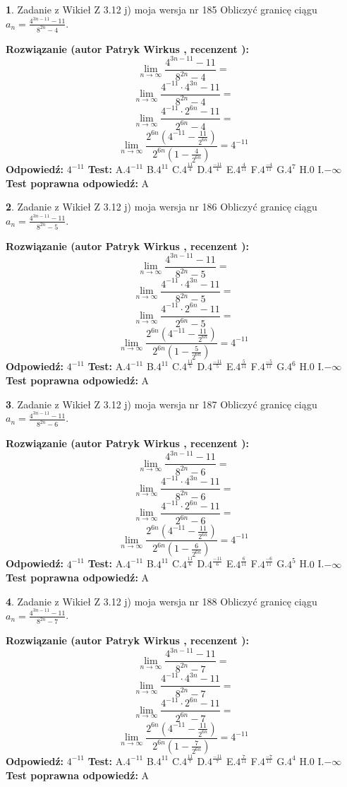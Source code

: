 \documentclass[12pt, a4paper]{article}
\theoremstyle{definition} %
\newtheorem{zad}{}
\newcommand{\zadStart}[1]{\begin{zad}#1\newline}
\newcommand{\zadStop}{\end{zad}}
\newcommand{\rozwStart}[2]{\noindent \textbf{Rozwiązanie (autor #1 , recenzent #2): }\newline}
\newcommand{\rozwStop}{\newline}
\newcommand{\odpStart}{\noindent \textbf{Odpowiedź:}\newline}
\newcommand{\odpStop}{\newline}
\newcommand{\testStart}{\noindent \textbf{Test:}\newline}
\newcommand{\testStop}{\newline}
\newcommand{\kluczStart}{\noindent \textbf{Test poprawna odpowiedź:}\newline}
\newcommand{\kluczStop}{\newline}
\begin{document}
\zadStart{Zadanie z Wikieł Z 3.12 j) moja wersja nr 185}
Obliczyć granicę ciągu $a_{n}=\frac{4^{3n-11}-11}{8^{2n}-4}$.
\zadStop
\rozwStart{Patryk Wirkus}{}
$$\lim\limits_{n\to\infty}\frac{4^{3n-11}-11}{8^{2n}-4}=$$
$$\lim\limits_{n\to\infty}\frac{4^{-11} \cdot 4^{3n}-11}{8^{2n}-4}=$$
$$\lim\limits_{n\to\infty}\frac{4^{-11} \cdot 2^{6n}-11}{2^{6n}-4}=$$
$$\lim\limits_{n\to\infty}\frac{2^{6n}(4^{-11} - \frac{11}{2^{6n}})}{2^{6n}(1-\frac{4}{2^{6n}})}= 4^{-11}$$
\rozwStop
\odpStart
$4^{-11}$
\odpStop
\testStart
A.$4^{-11}$
B.$4^{11}$
C.$4^{\frac{11}{4}}$
D.$4^{\frac{-11}{4}}$
E.$4^{\frac{4}{11}}$
F.$4^{\frac{-4}{11}}$
G.$4^{7}$
H.$0$
I.$-\infty$
\testStop
\kluczStart
A
\kluczStop



\zadStart{Zadanie z Wikieł Z 3.12 j) moja wersja nr 186}
Obliczyć granicę ciągu $a_{n}=\frac{4^{3n-11}-11}{8^{2n}-5}$.
\zadStop
\rozwStart{Patryk Wirkus}{}
$$\lim\limits_{n\to\infty}\frac{4^{3n-11}-11}{8^{2n}-5}=$$
$$\lim\limits_{n\to\infty}\frac{4^{-11} \cdot 4^{3n}-11}{8^{2n}-5}=$$
$$\lim\limits_{n\to\infty}\frac{4^{-11} \cdot 2^{6n}-11}{2^{6n}-5}=$$
$$\lim\limits_{n\to\infty}\frac{2^{6n}(4^{-11} - \frac{11}{2^{6n}})}{2^{6n}(1-\frac{5}{2^{6n}})}= 4^{-11}$$
\rozwStop
\odpStart
$4^{-11}$
\odpStop
\testStart
A.$4^{-11}$
B.$4^{11}$
C.$4^{\frac{11}{5}}$
D.$4^{\frac{-11}{5}}$
E.$4^{\frac{5}{11}}$
F.$4^{\frac{-5}{11}}$
G.$4^{6}$
H.$0$
I.$-\infty$
\testStop
\kluczStart
A
\kluczStop



\zadStart{Zadanie z Wikieł Z 3.12 j) moja wersja nr 187}
Obliczyć granicę ciągu $a_{n}=\frac{4^{3n-11}-11}{8^{2n}-6}$.
\zadStop
\rozwStart{Patryk Wirkus}{}
$$\lim\limits_{n\to\infty}\frac{4^{3n-11}-11}{8^{2n}-6}=$$
$$\lim\limits_{n\to\infty}\frac{4^{-11} \cdot 4^{3n}-11}{8^{2n}-6}=$$
$$\lim\limits_{n\to\infty}\frac{4^{-11} \cdot 2^{6n}-11}{2^{6n}-6}=$$
$$\lim\limits_{n\to\infty}\frac{2^{6n}(4^{-11} - \frac{11}{2^{6n}})}{2^{6n}(1-\frac{6}{2^{6n}})}= 4^{-11}$$
\rozwStop
\odpStart
$4^{-11}$
\odpStop
\testStart
A.$4^{-11}$
B.$4^{11}$
C.$4^{\frac{11}{6}}$
D.$4^{\frac{-11}{6}}$
E.$4^{\frac{6}{11}}$
F.$4^{\frac{-6}{11}}$
G.$4^{5}$
H.$0$
I.$-\infty$
\testStop
\kluczStart
A
\kluczStop



\zadStart{Zadanie z Wikieł Z 3.12 j) moja wersja nr 188}
Obliczyć granicę ciągu $a_{n}=\frac{4^{3n-11}-11}{8^{2n}-7}$.
\zadStop
\rozwStart{Patryk Wirkus}{}
$$\lim\limits_{n\to\infty}\frac{4^{3n-11}-11}{8^{2n}-7}=$$
$$\lim\limits_{n\to\infty}\frac{4^{-11} \cdot 4^{3n}-11}{8^{2n}-7}=$$
$$\lim\limits_{n\to\infty}\frac{4^{-11} \cdot 2^{6n}-11}{2^{6n}-7}=$$
$$\lim\limits_{n\to\infty}\frac{2^{6n}(4^{-11} - \frac{11}{2^{6n}})}{2^{6n}(1-\frac{7}{2^{6n}})}= 4^{-11}$$
\rozwStop
\odpStart
$4^{-11}$
\odpStop
\testStart
A.$4^{-11}$
B.$4^{11}$
C.$4^{\frac{11}{7}}$
D.$4^{\frac{-11}{7}}$
E.$4^{\frac{7}{11}}$
F.$4^{\frac{-7}{11}}$
G.$4^{4}$
H.$0$
I.$-\infty$
\testStop
\kluczStart
A
\kluczStop
\end{document}
